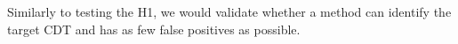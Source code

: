 Similarly to testing the H1, we would validate whether a method can identify the target CDT and has as few false positives as possible.
%

%
%
%
%
%
%
%
%
%
%
%
